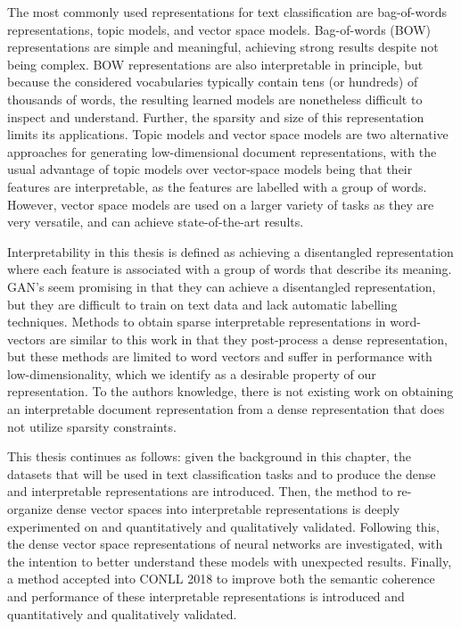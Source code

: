 The most commonly used representations for text classification are bag-of-words representations, topic models, and vector space models. Bag-of-words (BOW) representations are simple and meaningful, achieving strong results despite not being complex. BOW representations are also interpretable in principle, but because the considered vocabularies typically contain tens (or hundreds) of thousands of words, the resulting learned models are nonetheless difficult to inspect and understand. Further, the sparsity and size of this representation limits its applications. Topic models and vector space models are two alternative approaches for generating low-dimensional document representations, with the usual advantage of topic models over vector-space models being that their features are interpretable, as the features are labelled with a group of words. However, vector space models are used on a larger variety of tasks as they are very versatile, and can achieve state-of-the-art results. %

Interpretability in this thesis is defined as achieving a disentangled representation where each feature is associated with a group of words that describe its meaning. GAN's seem promising in that they can achieve a disentangled representation, but they are difficult to train on text data and lack automatic labelling techniques. Methods to obtain sparse interpretable representations in word-vectors are similar to this work in that they post-process a dense representation, but these methods are limited to word vectors and suffer in performance with low-dimensionality, which we identify as a desirable property of our representation. To the authors knowledge, there is not existing work on obtaining an interpretable document representation from a dense representation that does not utilize sparsity constraints.

This thesis continues as follows: given the background in this chapter, the datasets that will be used in text classification tasks and to produce the dense and interpretable representations are introduced. Then, the method to re-organize dense vector spaces into interpretable representations is deeply experimented on and quantitatively and qualitatively validated. Following this, the dense vector space representations of neural networks are investigated, with the intention to better understand these models with unexpected results. Finally, a method accepted into CONLL 2018 to improve both the semantic coherence and performance of these  interpretable representations  is introduced and quantitatively and qualitatively validated. 

